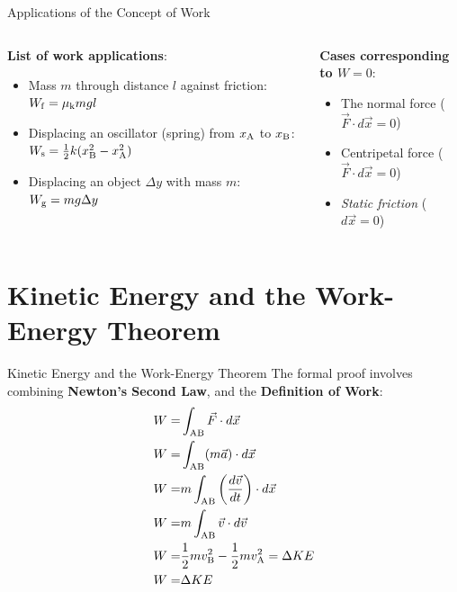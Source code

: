 \documentclass{beamer}
\begin{document}
\begin{frame}{Applications of the Concept of Work}
\begin{columns}[T]
\begin{column}{0.5\textwidth}
\small
\textbf{List of work applications}:
\begin{itemize}
\item Mass $m$ through distance $l$ against friction: $W_{\rm f} = \mu_{\rm k} m g l$
\item Displacing an oscillator (spring) from $x_{\rm A}$ to $x_{\rm B}$: $W_{\rm s} = \frac{1}{2}k(x_{\rm B}^2 - x_{\rm A}^2)$
\item Displacing an object $\Delta y$ with mass $m$: $W_{\rm g} = mg\Delta y$
\end{itemize}
\end{column}
\begin{column}{0.5\textwidth}
\small
\textbf{Cases corresponding to $W=0$}:
\begin{itemize}
\item The normal force ($\vec{F} \cdot d\vec{x} = 0$)
\item Centripetal force ($\vec{F} \cdot d\vec{x} = 0$)
\item \textit{Static friction} ($d\vec{x} = 0$)
\end{itemize}
\end{column}
\end{columns}
\end{frame}

\section{Kinetic Energy and the Work-Energy Theorem}

\begin{frame}{Kinetic Energy and the Work-Energy Theorem}
The formal proof involves combining \textbf{Newton's Second Law}, and the \textbf{Definition of Work}:
\begin{align}
W =& \int_{\rm AB} \vec{F} \cdot d\vec{x} \\
W =& \int_{\rm AB} (m\vec{a}) \cdot d\vec{x} \\
W =& m\int_{\rm AB} \left( \frac{d\vec{v}}{dt} \right) \cdot d\vec{x} \\
W =& m\int_{\rm AB} \vec{v} \cdot d\vec{v} \\
W =& \frac{1}{2}m v_{\rm B}^2 - \frac{1}{2}m v_{\rm A}^2 = \Delta KE \\
W =& \Delta KE
\end{align}
\end{frame}
\end{document}
